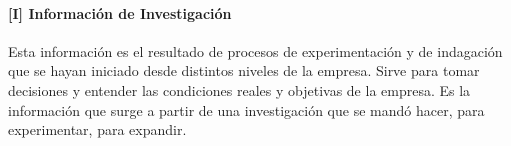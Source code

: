 \hypertarget{informaciuxf3n-de-investigaciuxf3n}{%
\paragraph{[I] Información de
Investigación}\label{informaciuxf3n-de-investigaciuxf3n}}
Esta información es el resultado de procesos de experimentación y de
indagación que se hayan iniciado desde distintos niveles de la empresa.
Sirve para tomar decisiones y entender las condiciones reales y
objetivas de la empresa. Es la información que surge a partir de una
investigación que se mandó hacer, para experimentar, para expandir.

\onecolumn
